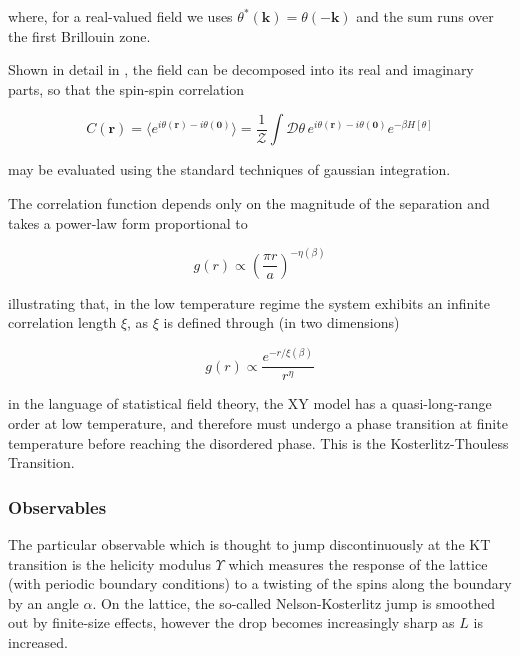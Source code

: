 \documentclass[12pt]{article}
\begin{document}
where, for a real-valued field we uses $\theta^*(\mathbf{k})=\theta(-\mathbf{k})$ and the sum runs over the first Brillouin zone.

Shown in detail in \cite{drouintouchette2022kosterlitzthoulessphasetransitionintroduction}, the field can be decomposed into its real and imaginary parts, so that the
spin-spin correlation

\begin{equation*}
	C(\mathbf{r}) = \langle e^{i\theta(\mathbf{r}) - i\theta(\mathbf{0})} \rangle = \frac{1}{\mathcal{Z}} \int \mathcal{D}\theta \, e^{i\theta(\mathbf{r}) - i\theta(\mathbf{0})} e^{-\beta H[\theta]}
\end{equation*}

may be evaluated using the standard techniques of gaussian integration.

The correlation function depends only on the magnitude of the separation and takes a power-law form proportional to

\begin{equation*}
	g(r) \propto \left(\frac{\pi r}{a}\right)^{-\eta(\beta)}
\end{equation*}

illustrating that, in the low temperature regime the system exhibits an infinite correlation length $\xi$, as $\xi$ is defined through (in two dimensions)

\begin{equation*}
	g(r) \propto \frac{e^{-r/\xi(\beta)}}{r^{\eta}}
\end{equation*}

in the language of statistical field theory, the XY model has a quasi-long-range order at low temperature, and therefore must undergo a phase transition
at finite temperature before reaching the disordered phase. This is the Kosterlitz-Thouless Transition. 

\subsubsection{Observables}

The particular observable which is thought to jump discontinuously at the KT transition is the helicity modulus $\Upsilon$ which measures the 
response of the lattice (with periodic boundary conditions) to a twisting of the spins along the boundary by an angle $\alpha$. On the lattice, the so-called
Nelson-Kosterlitz jump is smoothed out by finite-size effects, however the drop becomes increasingly sharp as $L$ is increased.
\end{document}
